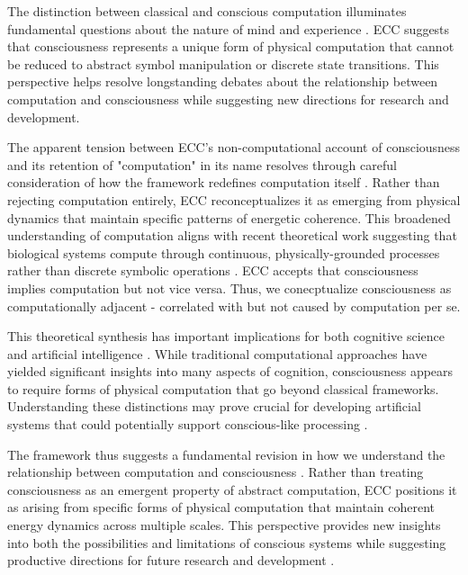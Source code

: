 The distinction between classical and conscious computation illuminates fundamental questions about the nature of mind and experience \cite{Chalmers2011}. ECC suggests that consciousness represents a unique form of physical computation that cannot be reduced to abstract symbol manipulation or discrete state transitions. This perspective helps resolve longstanding debates about the relationship between computation and consciousness while suggesting new directions for research and development.

The apparent tension between ECC's non-computational account of consciousness and its retention of "computation" in its name resolves through careful consideration of how the framework redefines computation itself \cite{MacLennan2004}. Rather than rejecting computation entirely, ECC reconceptualizes it as emerging from physical dynamics that maintain specific patterns of energetic coherence. This broadened understanding of computation aligns with recent theoretical work suggesting that biological systems compute through continuous, physically-grounded processes rather than discrete symbolic operations \cite{Siegelmann2003}. ECC accepts that consciousness implies computation but not vice versa. Thus, we conecptualize consciousness as computationally adjacent - correlated with but not caused by computation per se.

This theoretical synthesis has important implications for both cognitive science and artificial intelligence \cite{Deutsch2011}. While traditional computational approaches have yielded significant insights into many aspects of cognition, consciousness appears to require forms of physical computation that go beyond classical frameworks. Understanding these distinctions may prove crucial for developing artificial systems that could potentially support conscious-like processing \cite{Aaronson2013}.

The framework thus suggests a fundamental revision in how we understand the relationship between computation and consciousness \cite{Wheeler1990}. Rather than treating consciousness as an emergent property of abstract computation, ECC positions it as arising from specific forms of physical computation that maintain coherent energy dynamics across multiple scales. This perspective provides new insights into both the possibilities and limitations of conscious systems while suggesting productive directions for future research and development \cite{Landauer1996}.